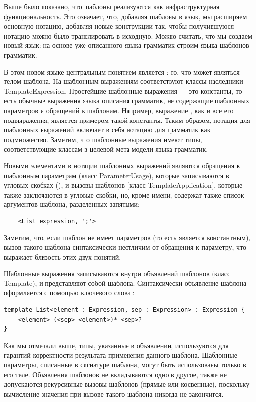 Выше было показано, что шаблоны реализуются как инфраструктурная функциональность. Это означает, что, добавляя шаблоны в язык, мы расширяем основную нотацию, добавляя новые конструкции так, чтобы получившуюся нотацию можно было транслировать в исходную. Можно считать, что мы создаем новый язык: на основе уже описанного языка грамматик строим языка шаблонов грамматик.

В этом новом языке центральным понятием является : то, что может являться телом шаблона. На  шаблонным выражениям соответствуют классы-наследники TemplateExpression. Простейшие шаблонные выражения --- это константы, то есть обычные выражения языка описания грамматик, не содержащие шаблонных параметров и обращений к шаблонам. Например, выражение , как и все его подвыражения, является примером такой константы. Таким образом, нотация для шаблонных выражений включает в себя нотацию для грамматик как подмножество. Заметим, что шаблонные выражения имеют типы, соответствующие классам в целевой мета-модели языка грамматик.

Новыми элементами в нотации шаблонных выражений являются обращения к шаблонным параметрам (класс ParameterUsage), которые записываются в угловых скобках (), и вызовы шаблонов (класс TemplateApplication), которые также заключаются в угловые скобки, но, кроме имени, содержат также список аргументов шаблона, разделенных запятыми:
\begin{lstlisting}
	<List expression, ';'>
\end{lstlisting}
Заметим, что, если шаблон не имеет параметров (то есть является константным), вызов такого шаблона синтаксически неотличим от обращения к параметру, что выражает близость этих двух понятий.

Шаблонные выражения записываются внутри объявлений шаблонов (класс Template), и представляют собой  шаблона. Синтаксически объявление шаблона оформляется с помощью ключевого слова :
\begin{lstlisting}
template List<element : Expression, sep : Expression> : Expression {
	<element> (<sep> <element>)* <sep>?
}
\end{lstlisting}
Как мы отмечали выше, типы, указанные в объявлении, используются для гарантий корректности результата применения данного шаблона. Шаблонные параметры, описанные в сигнатуре шаблона, могут быть использованы только в его теле. Объявления шаблонов не вкладываются одно в другое, также не допускаются рекурсивные вызовы шаблонов (прямые или косвенные), поскольку вычисление значения при вызове такого шаблона никогда не закончится.

